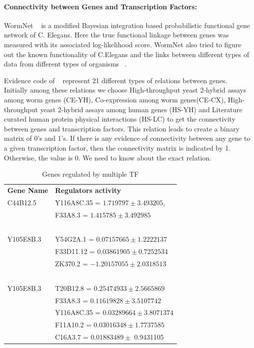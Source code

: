 \documentclass[12pt]{article}
\begin{document}
\paragraph{Connectivity between Genes and Transcription Factors:}
WormNet ~\cite{wormnet:url} is a modified Bayesian integration based probabilistic functional gene network of C. Elegans.
Here the true functional linkage between genes was measured with its associated log-likelihood score.
WormNet also tried to figure out the known functionality of C.Elegans and the links between 
different types of data from different types of organisms ~\cite{wormnet:01, wormnet:02}.

Evidence code of ~\cite{wormnet:url} represent 21 different types of relations between genes.
Initially among these relations we choose High-throughput yeast 2-hybrid assays among worm genes (CE-YH), 
Co-expression among worm genes(CE-CX), High-throughput yeast 2-hybrid assays among human genes (HS-YH) 
and Literature curated human protein physical interactions (HS-LC) to get the connectivity between genes 
and transcription factors. This relation leads to create a binary matrix of 0's and 1's. If there is any
evidence of connectivity between any gene to a given transcription factor, then the connectivity matrix
is indicated by 1. Otherwise, the value is 0. We need to know about the exact relation. 


\begin{table}[!htdp]
  \begin{tabular}{l l }
	      \textbf{Gene Name} & \textbf{Regulators activity} \\
	      {\color{red}C44B12.5} & {\color{blue} Y116A8C.35 }= $ 1.719797 \pm 3.493205 $, \\ 
				    & {\color{blue}F33A8.3} = $ 1.415785 \pm 3.492985$ \\~\\

		{\color{red}Y105E8B.3} & {\color{blue} Y54G2A.1} = $ 0.07157665 \pm 1.2222137 $ \\
		  & {\color{blue} F33D11.12} = $ 0.03861905 \pm 0.7252534 $ \\
 		  & {\color{blue} ZK370.2} = $ -1.20157055 \pm  2.0318513 $\\~\\
		    
	      {\color{red} Y105E8B.3} & {\color{blue} T20B12.8 } = $ 0.25474933 \pm  2.5665869 $ \\
		  			& {\color{blue} F33A8.3 } = $ 0.11619828  \pm  3.5107742 $ \\
 		  			& {\color{blue} Y116A8C.35 } = $ 0.03289664 \pm  3.8071374 $ \\
					& {\color{blue} F11A10.2 } = $ 0.03016348 \pm 1.7737585 $ \\
 		  			& {\color{blue} C16A3.7  } = $ 0.01883489 \pm  $ 0.9431105\\
  \end{tabular}
  \caption{Genes regulated by multiple TF}
  \label{table:gene_regulation}
\end{table}
\end{document}
